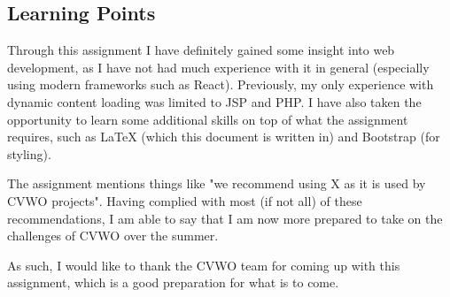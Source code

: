 \documentclass[12pt]{article}
\begin{document}
	\subsection{Learning Points}
	Through this assignment I have definitely gained some insight into web development, as I have not had much experience with it in general (especially using modern frameworks such as React). Previously, my only experience with dynamic content loading was limited to JSP and PHP. I have also taken the opportunity to learn some additional skills on top of what the assignment requires, such as \LaTeX{} (which this document is written in) and Bootstrap (for styling).
	
	The assignment mentions things like "we recommend using X as it is used by CVWO projects". Having complied with most (if not all) of these recommendations, I am able to say that I am now more prepared to take on the challenges of CVWO over the summer.
	
	As such, I would like to thank the CVWO team for coming up with this assignment, which is a good preparation for what is to come.
	
\end{document}
